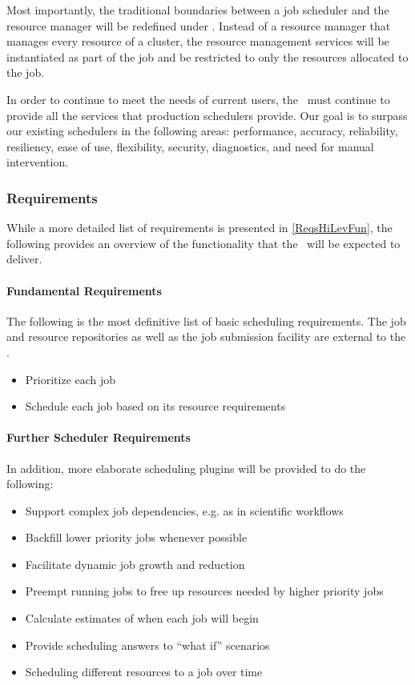 Most importantly, the traditional boundaries between a job scheduler
and the resource manager will be redefined under \ngrm.  Instead of a
resource manager that manages every resource of a cluster, the
resource management services will be instantiated as part of the job
and be restricted to only the resources allocated to the job.

In order to continue to meet the needs of current users, the
\ngjs\ must continue to provide all the services that production
schedulers provide.  Our goal is to surpass our existing schedulers in
the following areas: performance, accuracy, reliability, resiliency,
ease of use, flexibility, security, diagnostics, and need for manual
intervention.

\subsubsection{Requirements}

While a more detailed list of requirements is presented in
\ref{ReqsHiLevFun}, the following provides an overview of the
functionality that the \ngjs\ will be expected to deliver.

\paragraph{Fundamental Requirements}

The following is the most definitive list of basic scheduling
requirements.  The job and resource repositories as well as the job
submission facility are external to the \ngjs.

\begin{itemize}
  \item Prioritize each job
  \item Schedule each job based on its resource requirements
\end{itemize}

\paragraph{Further Scheduler Requirements}

In addition, more elaborate scheduling plugins will be provided to do
the following:

\begin{itemize}
  \item Support complex job dependencies, e.g. as in scientific workflows
  \item Backfill lower priority jobs whenever possible
  \item Facilitate dynamic job growth and reduction
  \item Preempt running jobs to free up resources needed by higher priority jobs
  \item Calculate estimates of when each job will begin
  \item Provide scheduling answers to ``what if'' scenarios
  \item Scheduling different resources to a job over time
\end{itemize}

